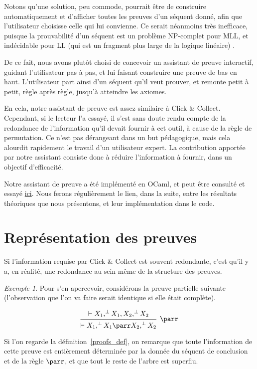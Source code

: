 \documentclass[11pt,a4paper]{article}
\theoremstyle{plain}
\theoremstyle{definition}
\theoremstyle{remark}
\newtheorem{example}{Exemple}
\newcommand*{\orth}{^\perp}
\newcommand*{\hypv}[1]{\hypo{\vdash #1}}
\newcommand*{\parrv}[1]{\infer{1}[\ensuremath{\parr}]{\vdash #1}}
\begin{document}
Notons qu'une solution, peu commode, pourrait être de construire automatiquement et d'afficher toutes les preuves d'un séquent donné, afin que l'utilisateur choisisse celle qui lui convienne. Ce serait néanmoins très inefficace, puisque la prouvabilité d'un séquent est un problème NP-complet pour MLL, et indécidable pour LL (qui est un fragment plus large de la logique linéaire) \cite{Lincoln_1995}.

De ce fait, nous avons plutôt choisi de concevoir un assistant de preuve interactif, guidant l'utilisateur pas à pas, et lui faisant construire une preuve de bas en haut. L'utilisateur part ainsi d'un séquent qu'il veut prouver, et remonte petit à petit, règle après règle, jusqu'à atteindre les axiomes.

En cela, notre assistant de preuve est assez similaire à Click \& Collect. Cependant, si le lecteur l'a essayé, il s'est sans doute rendu compte de la redondance de l'information qu'il devait fournir à cet outil, à cause de la règle de permutation. Ce n'est pas dérangeant dans un but pédagogique, mais cela alourdit rapidement le travail d'un utilisateur expert. La contribution apportée par notre assistant consiste donc à réduire l'information à fournir, dans un objectif d'efficacité.

Notre assistant de preuve a été implémenté en OCaml, et peut être consulté et essayé \href{https://github.com/jonas-trms/ll_prover}{ici}. Nous ferons régulièrement le lien, dans la suite, entre les résultats théoriques que nous présentons, et leur implémentation dans le code.

\section{Représentation des preuves}
Si l'information requise par Click \& Collect est souvent redondante, c'est qu'il y a, en réalité, une redondance au sein même de la structure des preuves.

\begin{example}
    Pour s'en apercevoir, considérons la preuve partielle suivante (l'observation que l'on va faire serait identique si elle était complète).

    \begin{equation*}
        \begin{prooftree}
            \hypv{X_1, \orth{X_1}, X_2, \orth{X_2}}
            \parrv{X_1, \orth{X_1} \parr X_2, \orth{X_2}}
        \end{prooftree}
    \end{equation*}
    

    Si l'on regarde la définition~\ref{proofs_def}, on remarque que toute l'information de cette preuve est entièrement déterminée par la donnée du séquent de conclusion et de la règle $\parr$, et que tout le reste de l'arbre est superflu.
\end{example}
\end{document}
